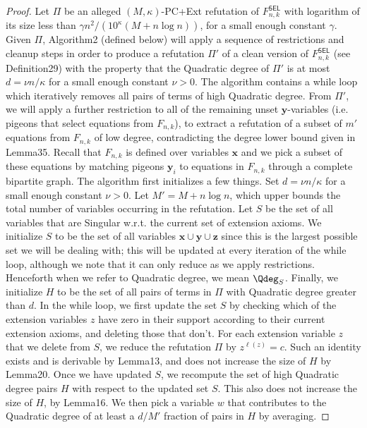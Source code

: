 \begin{proof}
Let $\Pi$ be an alleged $(M,\kappa)$-PC+Ext refutation of $F^{\mathsf{SEL}}_{n,k}$ with logarithm of its size less than $\gamma n^2/(10^{\kappa}(M+n\log n))$, for a small enough constant $\gamma$. Given $\Pi$, Algorithm2 (defined below) will apply a sequence of restrictions and cleanup steps in order to produce a refutation $\Pi'$ of a clean version of $F^{\mathsf{SEL}}_{n,k}$ (see Definition29) with the property that the Quadratic degree of $\Pi'$ is at most $d=\nu n/\kappa$ for a small enough constant $\nu>0$. The algorithm contains a while loop which iteratively removes all pairs of terms of high Quadratic degree. From $\Pi'$, we will apply a further restriction to all of the remaining unset $\mathbf y$-variables (i.e. pigeons that select equations from $F_{n,k}$), to extract a refutation of a subset of $m'$ equations from $F_{n,k}$ of low degree, contradicting the degree lower bound given in Lemma35. Recall that $F_{n,k}$ is defined over variables $\mathbf x$ and we pick a subset of these equations by matching pigeons $\mathbf y_i$ to equations in $F_{n,k}$ through a complete bipartite graph.
The algorithm first initializes a few things. Set $d=\nu n/\kappa$ for a small enough constant $\nu>0$. Let $M'=M+n\log n$, which upper bounds the total number of variables occurring in the refutation. Let $S$ be the set of all variables that are Singular w.r.t. the current set of extension axioms. We initialize $S$ to be the set of all variables $\mathbf x\cup\mathbf y\cup\mathbf z$ since this is the largest possible set we will be dealing with; this will be updated at every iteration of the while loop, although we note that it can only reduce as we apply restrictions. Henceforth when we refer to Quadratic degree, we mean $\Qdeg_S$. Finally, we initialize $H$ to be the set of all pairs of terms in $\Pi$ with Quadratic degree greater than $d$.
In the while loop, we first update the set $S$ by checking which of the extension variables $z$ have zero in their support according to their current extension axioms, and deleting those that don't. For each extension variable $z$ that we delete from $S$, we reduce the refutation $\Pi$ by $z^{\ell(z)}=c$. Such an identity exists and is derivable by Lemma13, and does not increase the size of $H$ by Lemma20. Once we have updated $S$, we recompute the set of high Quadratic degree pairs $H$ with respect to the updated set $S$. This also does not increase the size of $H$, by Lemma16. We then pick a variable $w$ that contributes to the Quadratic degree of at least a $d/M'$ fraction of pairs in $H$ by averaging.

\end{proof}
